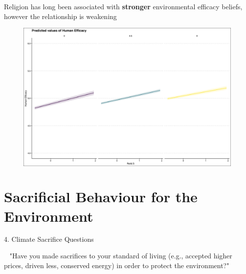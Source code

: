 \documentclass{beamer}
\begin{document}
\begin{frame}{Religion has long been associated with {\bf stronger} environmental efficacy beliefs, however the relationship is weakening}
\begin{figure}
\includegraphics[width=.8\textwidth,height=\textheight,keepaspectratio]{Figures/EFFICACY_RELIDS_T.png}
\end{figure}
\end{frame}


\section{Sacrificial Behaviour for the Environment}
\begin{frame}{4. Climate Sacrifice Questions}
    

\begin{alertblock}{~}
"Have you made sacrifices to your standard of living (e.g., accepted higher prices, driven less, conserved energy) in order to protect the environment?"
\end{alertblock}


\end{frame}
\end{document}
